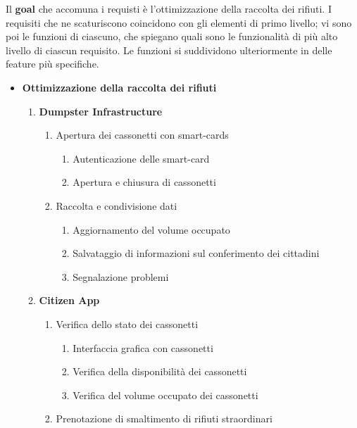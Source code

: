 Il \textbf{goal} che accomuna i requisti è l'ottimizzazione della raccolta dei rifiuti. I requisiti che ne scaturiscono coincidono con gli elementi di primo livello; vi sono poi le funzioni di ciascuno, che spiegano quali sono le funzionalità di più alto livello di ciascun requisito. Le funzioni si suddividono ulteriormente in delle feature più specifiche.

\begin{itemize}
    \item \textbf{Ottimizzazione della raccolta dei rifiuti}
    \begin{enumerate}[label*=\arabic*.]
        \item \textbf{Dumpster Infrastructure}
        \begin{enumerate}[label*=\arabic*.]
            \item Apertura dei cassonetti con smart-cards
            \begin{enumerate}[label*=\arabic*.]
                \item Autenticazione delle smart-card
                \item Apertura e chiusura di cassonetti
            \end{enumerate}
            \item Raccolta e condivisione dati
            \begin{enumerate}[label*=\arabic*.]
                \item Aggiornamento del volume occupato
                \item Salvataggio di informazioni sul conferimento dei cittadini
                \item Segnalazione problemi
            \end{enumerate}
        \end{enumerate}
        \item \textbf{Citizen App}
        \begin{enumerate}[label*=\arabic*.]
            \item Verifica dello stato dei cassonetti
            \begin{enumerate}[label*=\arabic*.]
                \item Interfaccia grafica con cassonetti
                \item Verifica della disponibilità dei cassonetti
                \item Verifica del volume occupato dei cassonetti
            \end{enumerate}
            \item Prenotazione di smaltimento di rifiuti straordinari

\end{enumerate}
\end{enumerate}
\end{itemize}

